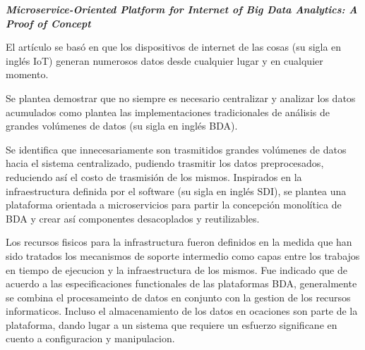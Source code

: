 
\textbf{
    \emph{ Microservice-Oriented Platform for Internet of Big Data Analytics: A Proof of Concept }
    } \cite{li_microservice-oriented_2019} 
 
El artículo se basó en que los dispositivos de internet de las cosas (su sigla en inglés IoT) generan numerosos datos desde cualquier lugar y en cualquier momento.

 Se plantea demostrar que no siempre es necesario centralizar y analizar los datos acumulados como plantea las implementaciones tradicionales de análisis de grandes volúmenes de datos (su sigla en inglés BDA).

Se identifica que innecesariamente son trasmitidos grandes volúmenes de datos hacia el sistema centralizado, pudiendo trasmitir los datos preprocesados, reduciendo así el costo de trasmisión de los mismos. 
Inspirados en la infraestructura definida por el software (su sigla en inglés SDI), se plantea una plataforma orientada a microservicios para partir la concepción monolítica de BDA y crear así componentes desacoplados y reutilizables.

Los recursos fisicos para la infrastructura fueron definidos en la medida que han sido tratados los mecanismos de soporte intermedio como capas entre los trabajos en tiempo de ejecucion y la infraestructura de los mismos.
Fue indicado que  de acuerdo a las especificaciones functionales de las plataformas BDA, generalmente se combina el procesameinto de datos en conjunto con la gestion de los recursos informaticos. Incluso el almacenamiento de los datos en ocaciones son parte de la plataforma, dando lugar a un sistema que requiere un esfuerzo significane en cuento a configuracion y manipulacion. 
